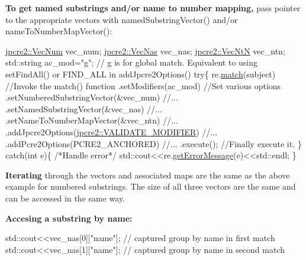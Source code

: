 {\bfseries To get named substrings and/or name to number mapping,} pass pointer to the appropriate vectors with {\ttfamily named\+Substring\+Vector()} and/or {\ttfamily name\+To\+Number\+Map\+Vector()}\+:


\begin{DoxyCode}
\hyperlink{namespacejpcre2_ac1cf752c8fbb0be78020be3b80e77ce3}{jpcre2::VecNum} vec\_num;   
\hyperlink{namespacejpcre2_a2b121ae776ea5b2913839f418a7d856b}{jpcre2::VecNas} vec\_nas;   
\hyperlink{namespacejpcre2_a88a7aaf84cad627d34c8152e726168eb}{jpcre2::VecNtN} vec\_ntn;   
std::string ac\_mod=\textcolor{stringliteral}{"g"};   \textcolor{comment}{// g is for global match. Equivalent to using setFindAll() or FIND\_ALL in
       addJpcre2Options()}
\textcolor{keywordflow}{try}\{
    re.\hyperlink{classjpcre2_1_1Regex_ab93775a93a0a537d09b9e9ab4a5a3894}{match}(subject)                               \textcolor{comment}{//Invoke the match() function}
      .setModifiers(ac\_mod)                         \textcolor{comment}{//Set various options}
      .setNumberedSubstringVector(&vec\_num)         \textcolor{comment}{//...}
      .setNamedSubstringVector(&vec\_nas)            \textcolor{comment}{//...}
      .setNameToNumberMapVector(&vec\_ntn)           \textcolor{comment}{//...}
      .addJpcre2Options(\hyperlink{namespacejpcre2_a85c143271501e383843f45b9999c2f00a9124b768bcae4d51430aa7f26126f387}{jpcre2::VALIDATE\_MODIFIER})  \textcolor{comment}{//...}
      .addPcre2Options(PCRE2\_ANCHORED)              \textcolor{comment}{//...}
      .execute();                                   \textcolor{comment}{//Finally execute it.}
\}
\textcolor{keywordflow}{catch}(\textcolor{keywordtype}{int} e)\{
    \textcolor{comment}{/*Handle error*/}
    std::cout<<re.\hyperlink{classjpcre2_1_1Regex_a92b75c438ccff871205b2175a6141fd5}{getErrorMessage}(e)<<std::endl;
\}
\end{DoxyCode}
 {\bfseries Iterating} through the vectors and associated maps are the same as the above example for numbered substrings. The size of all three vectors are the same and can be accessed in the same way.

{\bfseries Accesing a substring by name\+:}


\begin{DoxyCode}
std::cout<<vec\_nas[0][\textcolor{stringliteral}{"name"}]; \textcolor{comment}{// captured group by name in first match}
std::cout<<vec\_nas[1][\textcolor{stringliteral}{"name"}]; \textcolor{comment}{// captured group by name in second match}
\end{DoxyCode}


